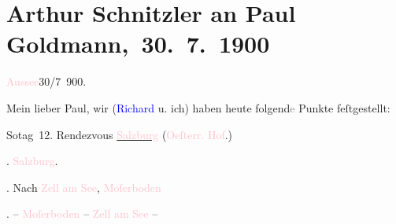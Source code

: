 

\renewcommand{\erwaehntePersonen}{Personen: Richard Beer-Hofmann, Paul Goldmann, Alfred Kerr}
\renewcommand{\erwaehnteOrte}{Orte: Bad Aussee, Berghaus Moserboden, Berlin, Bludenz, Bormio, Hotel und Pension Rudolfshöhe (Leopold Petter), Innsbruck, Iseosee, Italien, Küblis, Pontresina, Salzburg, Schruns, Schweiz, Solda, Sulzfluh, Trafoi, Zell am See, Österreichischer Hof}
\renewcommand{\erwaehnteWerke}{}
\section[ Arthur Schnitzler an Paul Goldmann, 30. 7. 1900]{Arthur Schnitzler an Paul Goldmann, 30. 7. 1900}
\nopagebreak{}
\rehead{ }\normalsize\beginnumbering{}
\toendnotes[C]{\smallbreak\pagebreak[2]}
\toendnotes[C]{\smallbreak}
\pstart
           \raggedleft{}{\pb}\textcolor{pink}{Aussee}{}\ledrightnote{\textcolor{pink}{Bad Aussee}}{ }30/7 900.\pend
           
\pstart
           Mein lieber Paul, wir (\textcolor{blue}{Richard}{}\ledrightnote{\textcolor{blue}{Richard Beer-Hofmann}} u. ich) haben heute
                  folgend\textcolor{gray}{e} Punkte feſtgestellt:\pend
           
\pstart
           So{\geminationn}tag 12. Rendezvous \uline{\textcolor{pink}{Salzburg}{}\ledrightnote{\textcolor{pink}{Salzburg}}} (\textcolor{pink}{Oeſterr. Hof}{}\ledrightnote{\textcolor{pink}{Österreichischer Hof}}.)\pend
           
.{ }\textcolor{pink}{Salzburg}{}\ledrightnote{\textcolor{pink}{Salzburg}}.\pend
           
. Nach \textcolor{pink}{Zell am
                  See}{}\ledrightnote{\textcolor{pink}{Zell am See}}, \textcolor{pink}{Moſerboden}{}\ledrightnote{\textcolor{pink}{Berghaus Moserboden}}\pend
           
. – \textcolor{pink}{Moſerboden}{}\ledrightnote{\textcolor{pink}{Berghaus Moserboden}}
               – \textcolor{pink}{Zell am See}{}\ledrightnote{\textcolor{pink}{Zell am See}} – \textcolor{pink}{}{}\ledrightnote{\textcolor{pink}{Innsbruck}}\pend
           
